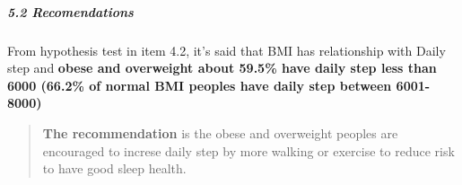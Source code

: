\documentclass[
]{article}
\begin{document}
\hypertarget{recomendations}{%
\subparagraph{5.2 Recomendations}\label{recomendations}}

From hypothesis test in item 4.2, it's said that BMI has relationship
with Daily step and \textbf{obese and overweight about 59.5\% have daily
step less than 6000 (66.2\% of normal BMI peoples have daily step
between 6001-8000)}

\begin{quote}
\textbf{The recommendation} is the obese and overweight peoples are
encouraged to increse daily step by more walking or exercise to reduce
risk to have good sleep health.
\end{quote}
\end{document}
